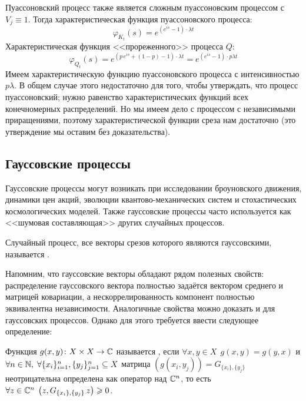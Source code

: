 \begin{Answer}
    \noindent
    Пуассоновский процесс также является сложным пуассоновским процессом с $ V_j \equiv 1 $.
    Тогда характеристическая функция пуассоновского процесса:
    \[
        \varphi_{K_t}(s) = e^{\left(e^{i s} - 1 \right) \cdot \lambda t}
    \]
    Характеристическая функция <<прореженного>> процесса $ Q $:
    \[
        \varphi_{Q_t}(s) = e^{\left(p \, e^{i s} + (1 - p) - 1 \right) \cdot \lambda t} = e^{\left(e^{i s} - 1 \right) \cdot p \lambda t}
    \]
    Имеем характеристическую функцию пуассоновского процесса с интенсивностью $ p \lambda $.
    В общем случае этого недостаточно для того, чтобы утверждать, что процесс пуассоновский;
    нужно равенство характеристических функций всех конечномерных распределений.
    Но мы имеем дело с процессом с независимыми приращениями, поэтому характеристической функции среза нам достаточно
    (это утверждение мы оставим без доказательства).
\end{Answer}




\subsection{Гауссовские процессы} \label{subsection:gaussian}

Гауссовские процессы могут возникать при исследовании броуновского движения,
динамики цен акций, эволюции квантово-механических систем и стохастических космологических моделей.
Также гауссовские процессы часто используется как <<шумовая составляющая>> других случайных процессов.

\begin{definition}
    \label{definition:special:gaussian_process}
    Случайный процесс, все векторы срезов которого являются гауссовскими,
    называется .
\end{definition}

Напомним, что гауссовские векторы обладают рядом полезных свойств:
распределение гауссовского вектора полностью задаётся вектором среднего и матрицей ковариации,
а нескоррелированность компонент полностью эквивалентна независимости.
Аналогичные свойства можно доказать и для гауссовских процессов.
Однако для этого требуется ввести следующее определение:

\begin{definition}
    \label{definition:special:positive_semi_definite_function}
    Функция $ g(x, y) \colon X \times X \to \mathbb{C} $ называется ,
    если $ \forall x, y \in X \;\, g(x, y) = g(y, x) $ и $ \forall n \in \mathbb{N}, \; \forall \{x_i\}_{i=1}^n, \{y_j\}_{j=1}^n \subseteq X $
    матрица $ (g(x_i, y_j)) = G_{\{x_i\}, \{y_j\}} $ неотрицательна определена как оператор над $ \mathbb{C}^n $,
    то есть $ \forall z \in \mathbb{C}^n \; \left(z, G_{\{x_i\}, \{y_j\}} \, z\right) \geqslant 0 $.
\end{definition}

